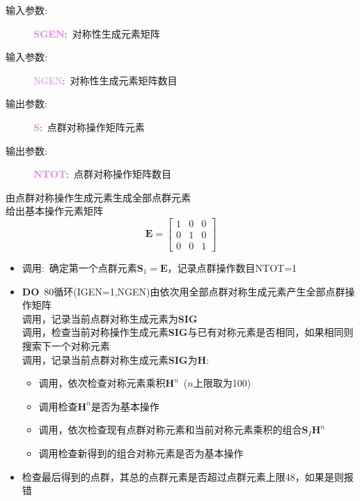 \documentclass{article}      %
\begin{document}
\vskip 30pt
\begin{description}
	\item[输入参数:~]\textcolor{violet}{\textbf{SGEN}}:~对称性生成元素矩阵
	\item[输入参数:~]\textcolor{violet}{\textrm{NGEN}}:~对称性生成元素矩阵数目
	\item[输出参数:~]\textcolor{violet}{\textbf{S}}:~点群对称操作矩阵元素
	\item[输出参数:~]\textcolor{violet}{\textbf{NTOT}}:~点群对称操作矩阵数目
\end{description}
由点群对称操作生成元素生成全部点群元素\\
给出基本操作元素矩阵
\begin{displaymath}
	\mathbf{E}=
	\begin{bmatrix}
		1 & 0 & 0\\
		0 & 1 & 0\\
		0 & 0 & 1
	\end{bmatrix}
\end{displaymath}
\begin{itemize}
	\item 调用:~确定第一个点群元素$\mathbf{S}_1=\mathbf{E}$，记录点群操作数目\textrm{NTOT}=1
	\item \textbf{DO}~80循环(\textrm{IGEN}=1,\textrm{NGEN})由依次用全部点群对称生成元素产生全部点群操作矩阵\\
		调用，记录当前点群对称生成元素为\textbf{SIG}\\
		调用，检查当前对称操作生成元素\textbf{SIG}与已有对称元素是否相同，如果相同则搜索下一个对称元素\\
		调用，记录当前点群对称生成元素\textbf{SIG}为\textbf{H}:
		\begin{itemize}
			\item 调用，依次检查对称元素乘积$\mathbf{H}^n$~($n$上限取为100) 
			\item 调用检查$\mathbf{H}^n$是否为基本操作
		\end{itemize}
		\begin{itemize}
			\item 调用，依次检查现有点群对称元素和当前对称元素乘积的组合$\mathbf{S}_I\mathbf{H}^n$
			\item 调用检查新得到的组合对称元素是否为基本操作
		\end{itemize}
	\item 检查最后得到的点群，其总的点群元素是否超过点群元素上限48，如果是则报错
\end{itemize}
\end{document}
